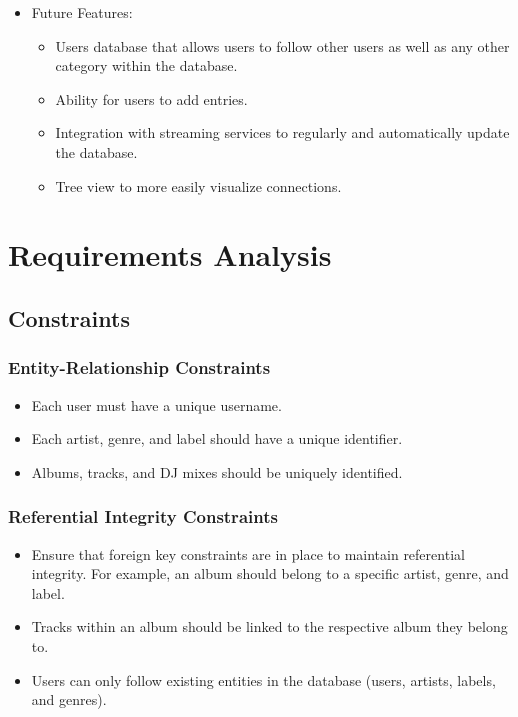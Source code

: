 \documentclass{article}
\begin{document}
\begin{itemize}
\begin{itemize}
        \end{itemize}
        \item Future Features:
        \begin{itemize}
            \item Users database that allows users to follow other users as well as any other category within the database.
            \item Ability for users to add entries.
            \item Integration with streaming services to regularly and automatically update the database.
            \item Tree view to more easily visualize connections.
        \end{itemize}
    \end{itemize}


\section{Requirements Analysis}

\subsection{Constraints}

\subsubsection{Entity-Relationship Constraints}
\begin{itemize}
    \item Each user must have a unique username.
    \item Each artist, genre, and label should have a unique identifier.
    \item Albums, tracks, and DJ mixes should be uniquely identified.
\end{itemize}

\subsubsection{Referential Integrity Constraints}
\begin{itemize}
    \item Ensure that foreign key constraints are in place to maintain referential integrity. For example, an album should belong to a specific artist, genre, and label.
    \item Tracks within an album should be linked to the respective album they belong to.
    \item Users can only follow existing entities in the database (users, artists, labels, and genres).
\end{itemize}
\end{document}
